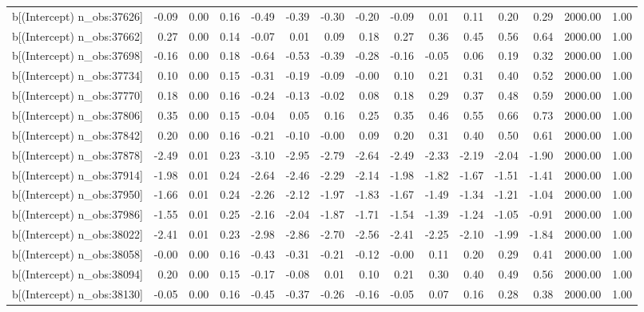 \begin{table}[ht]
\begin{tabular}{rrrrrrrrrrrrrrr}
  b[(Intercept) n\_obs:37626] & -0.09 & 0.00 & 0.16 & -0.49 & -0.39 & -0.30 & -0.20 & -0.09 & 0.01 & 0.11 & 0.20 & 0.29 & 2000.00 & 1.00 \\ 
  b[(Intercept) n\_obs:37662] & 0.27 & 0.00 & 0.14 & -0.07 & 0.01 & 0.09 & 0.18 & 0.27 & 0.36 & 0.45 & 0.56 & 0.64 & 2000.00 & 1.00 \\ 
  b[(Intercept) n\_obs:37698] & -0.16 & 0.00 & 0.18 & -0.64 & -0.53 & -0.39 & -0.28 & -0.16 & -0.05 & 0.06 & 0.19 & 0.32 & 2000.00 & 1.00 \\ 
  b[(Intercept) n\_obs:37734] & 0.10 & 0.00 & 0.15 & -0.31 & -0.19 & -0.09 & -0.00 & 0.10 & 0.21 & 0.31 & 0.40 & 0.52 & 2000.00 & 1.00 \\ 
  b[(Intercept) n\_obs:37770] & 0.18 & 0.00 & 0.16 & -0.24 & -0.13 & -0.02 & 0.08 & 0.18 & 0.29 & 0.37 & 0.48 & 0.59 & 2000.00 & 1.00 \\ 
  b[(Intercept) n\_obs:37806] & 0.35 & 0.00 & 0.15 & -0.04 & 0.05 & 0.16 & 0.25 & 0.35 & 0.46 & 0.55 & 0.66 & 0.73 & 2000.00 & 1.00 \\ 
  b[(Intercept) n\_obs:37842] & 0.20 & 0.00 & 0.16 & -0.21 & -0.10 & -0.00 & 0.09 & 0.20 & 0.31 & 0.40 & 0.50 & 0.61 & 2000.00 & 1.00 \\ 
  b[(Intercept) n\_obs:37878] & -2.49 & 0.01 & 0.23 & -3.10 & -2.95 & -2.79 & -2.64 & -2.49 & -2.33 & -2.19 & -2.04 & -1.90 & 2000.00 & 1.00 \\ 
  b[(Intercept) n\_obs:37914] & -1.98 & 0.01 & 0.24 & -2.64 & -2.46 & -2.29 & -2.14 & -1.98 & -1.82 & -1.67 & -1.51 & -1.41 & 2000.00 & 1.00 \\ 
  b[(Intercept) n\_obs:37950] & -1.66 & 0.01 & 0.24 & -2.26 & -2.12 & -1.97 & -1.83 & -1.67 & -1.49 & -1.34 & -1.21 & -1.04 & 2000.00 & 1.00 \\ 
  b[(Intercept) n\_obs:37986] & -1.55 & 0.01 & 0.25 & -2.16 & -2.04 & -1.87 & -1.71 & -1.54 & -1.39 & -1.24 & -1.05 & -0.91 & 2000.00 & 1.00 \\ 
  b[(Intercept) n\_obs:38022] & -2.41 & 0.01 & 0.23 & -2.98 & -2.86 & -2.70 & -2.56 & -2.41 & -2.25 & -2.10 & -1.99 & -1.84 & 2000.00 & 1.00 \\ 
  b[(Intercept) n\_obs:38058] & -0.00 & 0.00 & 0.16 & -0.43 & -0.31 & -0.21 & -0.12 & -0.00 & 0.11 & 0.20 & 0.29 & 0.41 & 2000.00 & 1.00 \\ 
  b[(Intercept) n\_obs:38094] & 0.20 & 0.00 & 0.15 & -0.17 & -0.08 & 0.01 & 0.10 & 0.21 & 0.30 & 0.40 & 0.49 & 0.56 & 2000.00 & 1.00 \\ 
  b[(Intercept) n\_obs:38130] & -0.05 & 0.00 & 0.16 & -0.45 & -0.37 & -0.26 & -0.16 & -0.05 & 0.07 & 0.16 & 0.28 & 0.38 & 2000.00 & 1.00 \\ 

\end{tabular}
\end{table}
